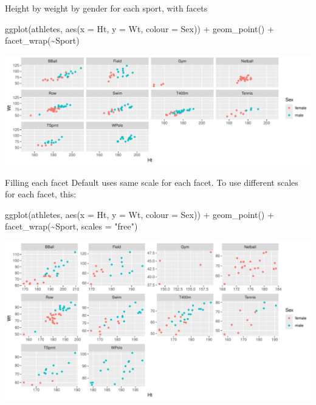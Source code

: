 \documentclass[
  ignorenonframetext,
]{beamer}
\newenvironment{Shaded}{\begin{snugshade}}{\end{snugshade}}
\newcommand{\AttributeTok}[1]{\textcolor[rgb]{0.40,0.45,0.13}{#1}}
\newcommand{\FunctionTok}[1]{\textcolor[rgb]{0.28,0.35,0.67}{#1}}
\newcommand{\NormalTok}[1]{\textcolor[rgb]{0.00,0.23,0.31}{#1}}
\newcommand{\SpecialCharTok}[1]{\textcolor[rgb]{0.37,0.37,0.37}{#1}}
\newcommand{\StringTok}[1]{\textcolor[rgb]{0.13,0.47,0.30}{#1}}
\begin{document}
\begin{frame}[fragile]{Height by weight by gender for each sport, with
facets}
\label{height-by-weight-by-gender-for-each-sport-with-facets}
\begin{Shaded}
\begin{Highlighting}[]
\FunctionTok{ggplot}\NormalTok{(athletes, }\FunctionTok{aes}\NormalTok{(}\AttributeTok{x =}\NormalTok{ Ht, }\AttributeTok{y =}\NormalTok{ Wt, }\AttributeTok{colour =}\NormalTok{ Sex)) }\SpecialCharTok{+}
  \FunctionTok{geom\_point}\NormalTok{() }\SpecialCharTok{+} \FunctionTok{facet\_wrap}\NormalTok{(}\SpecialCharTok{\textasciitilde{}}\NormalTok{Sport)}
\end{Highlighting}
\end{Shaded}

\includegraphics{graphs_files/figure-beamer/graphs-R-12-1.pdf}
\end{frame}

\begin{frame}[fragile]{Filling each facet}
\label{filling-each-facet}
Default uses same scale for each facet. To use different scales for each
facet, this:

\begin{Shaded}
\begin{Highlighting}[]
\FunctionTok{ggplot}\NormalTok{(athletes, }\FunctionTok{aes}\NormalTok{(}\AttributeTok{x =}\NormalTok{ Ht, }\AttributeTok{y =}\NormalTok{ Wt, }\AttributeTok{colour =}\NormalTok{ Sex)) }\SpecialCharTok{+}
  \FunctionTok{geom\_point}\NormalTok{() }\SpecialCharTok{+} \FunctionTok{facet\_wrap}\NormalTok{(}\SpecialCharTok{\textasciitilde{}}\NormalTok{Sport, }\AttributeTok{scales =} \StringTok{"free"}\NormalTok{)}
\end{Highlighting}
\end{Shaded}

\includegraphics{graphs_files/figure-beamer/graphs-R-13-1.pdf}
\end{frame}
\end{document}
